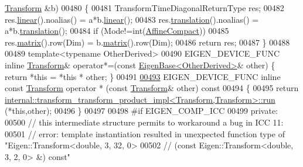 \begin{DoxyCode}
      \hyperlink{group___geometry___module_class_eigen_1_1_transform}{Transform} &b)
00480   \{
00481     TransformTimeDiagonalReturnType res;
00482     res.\hyperlink{group___geometry___module_a535bd63d047c2a36585c3f9b62219a1e}{linear}().noalias() = a*b.\hyperlink{group___geometry___module_a535bd63d047c2a36585c3f9b62219a1e}{linear}();
00483     res.\hyperlink{group___geometry___module_afa93ba97d26912bb3d8777cbed102045}{translation}().noalias() = a*b.\hyperlink{group___geometry___module_afa93ba97d26912bb3d8777cbed102045}{translation}();
00484     \textcolor{keywordflow}{if} (Mode!=\textcolor{keywordtype}{int}(\hyperlink{group__enums_ggaee59a86102f150923b0cac6d4ff05107aa30a06b60d218b709020972df47de2b0}{AffineCompact}))
00485       res.\hyperlink{group___geometry___module_aec8168000a88a807130d41020af98d47}{matrix}().row(Dim) = b.\hyperlink{group___geometry___module_aec8168000a88a807130d41020af98d47}{matrix}().row(Dim);
00486     \textcolor{keywordflow}{return} res;
00487   \}
00488 
00489   \textcolor{keyword}{template}<\textcolor{keyword}{typename} OtherDerived>
00490   EIGEN\_DEVICE\_FUNC \textcolor{keyword}{inline} \hyperlink{group___geometry___module_class_eigen_1_1_transform}{Transform}& operator*=(\textcolor{keyword}{const} 
      \hyperlink{group___core___module_struct_eigen_1_1_eigen_base}{EigenBase<OtherDerived>}& other) \{ \textcolor{keywordflow}{return} *\textcolor{keyword}{this} = *\textcolor{keyword}{this} * other; \}
00491 
\hyperlink{group___geometry___module_a5c6f7fee617deca6f2a9052fadbe81e5}{00493}   EIGEN\_DEVICE\_FUNC \textcolor{keyword}{inline} \textcolor{keyword}{const} \hyperlink{group___geometry___module_class_eigen_1_1_transform}{Transform} operator * (\textcolor{keyword}{const} \hyperlink{group___geometry___module_class_eigen_1_1_transform}{Transform}& other)\textcolor{keyword}{ const}
00494 \textcolor{keyword}{  }\{
00495     \textcolor{keywordflow}{return} \hyperlink{struct_eigen_1_1internal_1_1transform__transform__product__impl}{internal::transform\_transform\_product\_impl<Transform,Transform>::run}
      (*\textcolor{keyword}{this},other);
00496   \}
00497   
00498 \textcolor{preprocessor}{  #if EIGEN\_COMP\_ICC}
00499 \textcolor{keyword}{private}:
00500   \textcolor{comment}{// this intermediate structure permits to workaround a bug in ICC 11:}
00501   \textcolor{comment}{//   error: template instantiation resulted in unexpected function type of "Eigen::Transform<double, 3,
       32, 0>}
00502   \textcolor{comment}{//             (const Eigen::Transform<double, 3, 2, 0> &) const"}

\end{DoxyCode}
